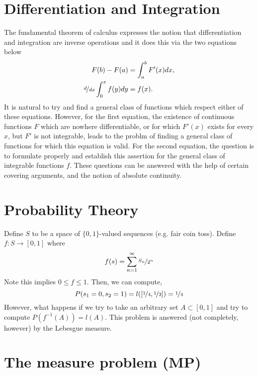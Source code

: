 \documentclass[a4paper, 11pt]{book}
\theoremstyle{definition}
\theoremstyle{remark}
\begin{document}
    \section{Differentiation and Integration}
    The fundamental theorem of calculus expresses the notion that differentiation and integration are inverse operations and it
    does this via the two equations below
    \begin{align}
        F(b) - F(a) &= \int_a^b F'(x)dx, \\
        \nicefrac{d}{dx}\int_0^x f(y)dy &= f(x).
    \end{align}
    It is natural to try and find a general class of functions which respect either of these equations. However, for the first
    equation, the existence of continuous functions $F$ which are nowhere differentiable, or for which $F'(x)$ exists for every
    $x$, but $F'$ is not integrable, leads to the problm of finding a general class of functions for which this equation is valid.
    For the second equation, the question is to formulate properly and establish this assertion for the general class of integrable
    functions $f$. These questions can be answered with the help of certain covering arguments, and the notion of absolute continuity.

    \section{Probability Theory}
    Define $S$ to be a space of $\{0,1\}$-valued sequences (e.g. fair coin toss). Define $f: S \to [0,1]$ where
    \[ f(s) = \sum_{n=1}^{\infty} \nicefrac{S_n}{2^n} \]
    Note this implies $0\leq f \leq 1$.
    Then, we can compute,
    \[ P(s_1=0,s_2=1) = l([\nicefrac{1}{4},\nicefrac{1}{2}]) = \nicefrac{1}{4} \]
    However, what happens if we try to take an arbitrary set $A\subset [0,1]$ and try to compute $P(f^{-1}(A)) = l(A)$. This problem
    is answered (not completely, however) by the Lebesgue measure.

    \section{The measure problem (MP)}
\end{document}
